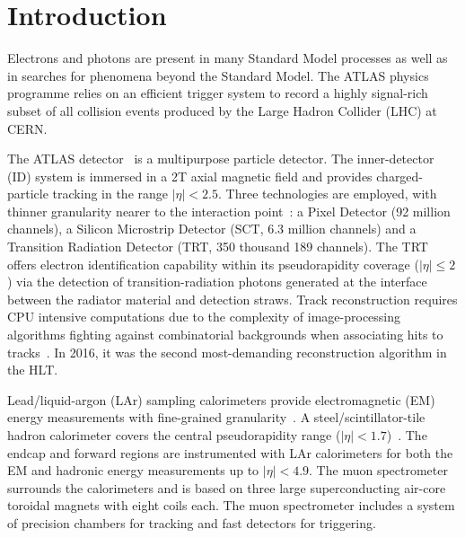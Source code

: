 \chapter{Introduction}

Electrons and photons are present in many Standard Model processes as well as in searches for phenomena beyond the Standard Model. The ATLAS physics programme relies on an efficient trigger system to record a highly signal-rich subset of all collision events produced by the Large Hadron Collider (LHC) at CERN.

The ATLAS detector~\cite{PERF-2007-01} is a multipurpose particle detector. The inner-detector (ID) system is immersed in a 2T  axial magnetic field and provides charged-particle tracking in the range $|\eta|<2.5$.  Three technologies are employed, with thinner granularity nearer to the interaction point~\cite{PERF-2015-08,CERN-LHCC-97-016,Haywood:331064}: a Pixel Detector (92 million channels), a Silicon Microstrip Detector (SCT, 6.3 million channels) and a Transition Radiation Detector (TRT, 350 thousand 189 channels). The TRT offers electron identification capability within its pseudorapidity coverage ($|\eta|\leq 2$) via the detection of transition-radiation photons generated at the interface between the radiator material and detection straws. Track reconstruction requires CPU intensive computations due to the complexity of image-processing algorithms fighting against combinatorial backgrounds when associating hits to tracks~\cite{PERF-2015-08}. In 2016, it was the second most-demanding reconstruction algorithm in the HLT.

Lead/liquid-argon (LAr) sampling calorimeters provide electromagnetic (EM) energy measurements with fine-grained granularity~\cite{LARG-2009-01,larg_tdr}. A steel/scintillator-tile hadron calorimeter covers the central pseudorapidity range ($|\eta|< 1.7$)~\cite{TCAL-2017-01,tile_tdr}. The endcap and forward regions are instrumented with LAr calorimeters for both the EM and hadronic energy measurements up to $|\eta|< 4.9$. The muon spectrometer surrounds the calorimeters and is based on three large superconducting air-core toroidal magnets with eight coils each.  The muon spectrometer includes a system of precision chambers for tracking and fast detectors for triggering. 

